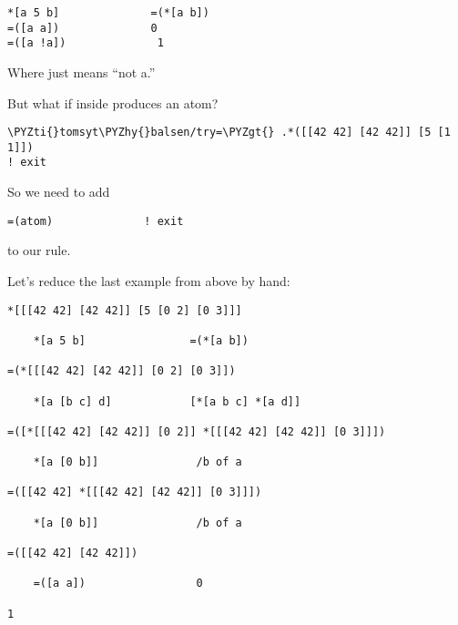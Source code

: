 \begin{framed_shaded}
\begin{Verbatim}[fontsize=\relsize{-2.5},commandchars=\\\{\}]
*[a 5 b]              =(*[a b])
=([a a])              0
=([a !a])              1
\end{Verbatim}
\end{framed_shaded}
Where  just means ``not a.''

But what if \kode{*[a b]} inside \kode{=(*[a b])} produces an atom?

\begin{framed_shaded}
\begin{Verbatim}[fontsize=\relsize{-2.5},commandchars=\\\{\}]
\PYZti{}tomsyt\PYZhy{}balsen/try=\PYZgt{} .*([[42 42] [42 42]] [5 [1 1]])
! exit
\end{Verbatim}
\end{framed_shaded}
So we need to add

\begin{framed_shaded}
\begin{Verbatim}[fontsize=\relsize{-2.5},commandchars=\\\{\}]
=(atom)              ! exit
\end{Verbatim}
\end{framed_shaded}
to our rule.

Let's reduce the last example from above by hand:

\begin{framed_shaded}
\begin{Verbatim}[fontsize=\relsize{-2.5},commandchars=\\\{\}]
*[[[42 42] [42 42]] [5 [0 2] [0 3]]]

    *[a 5 b]                =(*[a b])

=(*[[[42 42] [42 42]] [0 2] [0 3]])

    *[a [b c] d]            [*[a b c] *[a d]]

=([*[[[42 42] [42 42]] [0 2]] *[[[42 42] [42 42]] [0 3]]])

    *[a [0 b]]               /b of a

=([[42 42] *[[[42 42] [42 42]] [0 3]]])

    *[a [0 b]]               /b of a

=([[42 42] [42 42]])

    =([a a])                 0

1
\end{Verbatim}
\end{framed_shaded}

